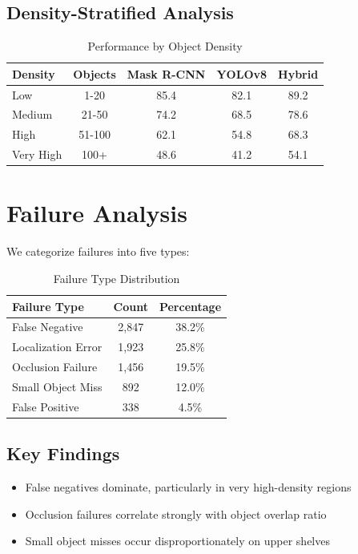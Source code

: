 \documentclass[conference]{IEEEtran}
\begin{document}
\subsection{Density-Stratified Analysis}

\begin{table}[H]
\centering
\caption{Performance by Object Density}
\begin{tabular}{lcccc}
\toprule
\textbf{Density} & \textbf{Objects} & \textbf{Mask R-CNN} & \textbf{YOLOv8} & \textbf{Hybrid} \\
\midrule
Low & 1-20 & 85.4 & 82.1 & 89.2 \\
Medium & 21-50 & 74.2 & 68.5 & 78.6 \\
High & 51-100 & 62.1 & 54.8 & 68.3 \\
Very High & 100+ & 48.6 & 41.2 & 54.1 \\
\bottomrule
\end{tabular}
\end{table}

\section{Failure Analysis}

We categorize failures into five types:

\begin{table}[H]
\centering
\caption{Failure Type Distribution}
\begin{tabular}{lcc}
\toprule
\textbf{Failure Type} & \textbf{Count} & \textbf{Percentage} \\
\midrule
False Negative & 2,847 & 38.2\% \\
Localization Error & 1,923 & 25.8\% \\
Occlusion Failure & 1,456 & 19.5\% \\
Small Object Miss & 892 & 12.0\% \\
False Positive & 338 & 4.5\% \\
\bottomrule
\end{tabular}
\end{table}

\subsection{Key Findings}

\begin{itemize}
    \item False negatives dominate, particularly in very high-density regions
    \item Occlusion failures correlate strongly with object overlap ratio
    \item Small object misses occur disproportionately on upper shelves
\end{itemize}
\end{document}
